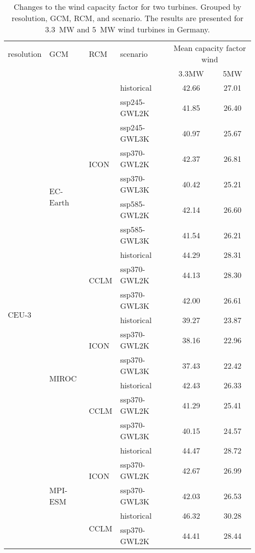 \begin{table}[!htbp]
\centering
\caption{Changes to the wind capacity factor for two turbines. Grouped by resolution, GCM, RCM, and scenario. The results are presented for \qty{3.3}{\mega\watt} and \qty{5}{\mega\watt} wind turbines in Germany.}
\label{Table:CF_Wind_changes}
\begin{tabular}{lll|l|cc}
\toprule
resolution & GCM & RCM & scenario & \multicolumn{2}{c}{Mean capacity factor wind} \\
 & & & & 3.3\si{\mega\watt} & 5\si{\mega\watt}  \\
\midrule
\multirow{22}{*}{CEU-3} & \multirow{10}{*}{EC-Earth} & \multirow{7}{*}{ICON} & historical & 42.66 & 27.01 \\
 &  &  & ssp245-GWL2K & 41.85 & 26.40 \\
 &  &  & ssp245-GWL3K & 40.97 & 25.67 \\
 &  &  & ssp370-GWL2K & 42.37 & 26.81 \\
 &  &  & ssp370-GWL3K & 40.42 & 25.21 \\
 &  &  & ssp585-GWL2K & 42.14 & 26.60 \\
 &  &  & ssp585-GWL3K & 41.54 & 26.21 \\
\cmidrule(lr){3-6}
 &  & \multirow{3}{*}{CCLM} & historical & 44.29 & 28.31 \\
 &  &  & ssp370-GWL2K & 44.13 & 28.30 \\
 &  &  & ssp370-GWL3K & 42.00 & 26.61 \\
\cmidrule(lr){3-6}
\cmidrule(lr){2-6}
 & \multirow{6}{*}{MIROC} & \multirow{3}{*}{ICON} & historical & 39.27 & 23.87 \\
 &  &  & ssp370-GWL2K & 38.16 & 22.96 \\
 &  &  & ssp370-GWL3K & 37.43 & 22.42 \\
\cmidrule(lr){3-6}
 &  & \multirow{3}{*}{CCLM} & historical & 42.43 & 26.33 \\
 &  &  & ssp370-GWL2K & 41.29 & 25.41 \\
 &  &  & ssp370-GWL3K & 40.15 & 24.57 \\
\cmidrule(lr){3-6}
\cmidrule(lr){2-6}
 & \multirow{6}{*}{MPI-ESM} & \multirow{3}{*}{ICON} & historical & 44.47 & 28.72 \\
 &  &  & ssp370-GWL2K & 42.67 & 26.99 \\
 &  &  & ssp370-GWL3K & 42.03 & 26.53 \\
\cmidrule(lr){3-6}
 &  & \multirow{3}{*}{CCLM} & historical & 46.32 & 30.28 \\
 &  &  & ssp370-GWL2K & 44.41 & 28.44 \\

\end{tabular}
\end{table}
